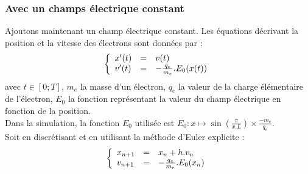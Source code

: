 \documentclass{article}
\begin{document}
\subsubsection*{Avec un champs électrique constant}
Ajoutons maintenant un champ électrique constant. Les équations décrivant la position et la vitesse des électrons sont données par :
$$
\left \{
   \begin{array}{l l l}
      x'(t)  & = & v(t) \\
      v'(t)  & = & -\frac{q_e}{m_e}.E_0(x(t)) \\
	\end{array}
\right.
$$
avec $t \in [0;T]$, $m_e$ la masse d'un électron, $q_e$ la valeur de la charge élémentaire de l'électron, $E_0$ la fonction représentant la valeur du champ électrique en fonction de la position.\\
Dans la simulation, la fonction $E_0$ utilisée est $E_0 : x \mapsto \sin(\frac{\pi}{x.L}) \times \frac{-m_e}{q_e}$.\\
Soit en discrétisant et en utilisant la méthode d'Euler explicite :
$$
\left \{
   \begin{array}{l l l}
      x_{n+1}  & = & x_n + h.v_n \\
      v_{n+1}  & = & -\frac{q_e}{m_e}.E_0(x_n) \\
	\end{array}
\right.
$$
\end{document}
